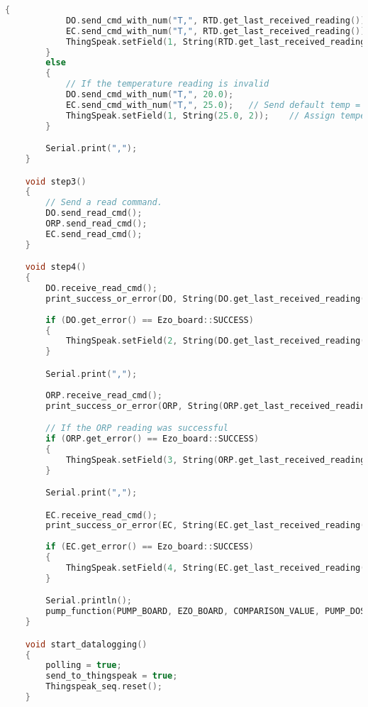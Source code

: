 \begin{lstlisting}[language=C++]
        {
            DO.send_cmd_with_num("T,", RTD.get_last_received_reading());
            EC.send_cmd_with_num("T,", RTD.get_last_received_reading());
            ThingSpeak.setField(1, String(RTD.get_last_received_reading(), 2)); // Assign temperature readings to the first column of thingspeak channel
        } 
        else 
        {
            // If the temperature reading is invalid
            DO.send_cmd_with_num("T,", 20.0);
            EC.send_cmd_with_num("T,", 25.0);   // Send default temp = 25 deg C to PH sensor
            ThingSpeak.setField(1, String(25.0, 2));    // Assign temperature readings to the first column of thingspeak channel
        }

        Serial.print(",");
    }

    void step3() 
    {
        // Send a read command.
        DO.send_read_cmd();
        ORP.send_read_cmd();
        EC.send_read_cmd();
    }

    void step4() 
    {
        DO.receive_read_cmd();
        print_success_or_error(DO, String(DO.get_last_received_reading(), 2).c_str());
        
        if (DO.get_error() == Ezo_board::SUCCESS) 
        {
            ThingSpeak.setField(2, String(DO.get_last_received_reading(), 2));  // Assign PH readings to the second column of thingspeak channel
        }

        Serial.print(",");
        
        ORP.receive_read_cmd();
        print_success_or_error(ORP, String(ORP.get_last_received_reading(), 2).c_str());

        // If the ORP reading was successful
        if (ORP.get_error() == Ezo_board::SUCCESS) 
        {
            ThingSpeak.setField(3, String(ORP.get_last_received_reading(), 0)); // Assign ORP readings to the third column of thingspeak channel
        }

        Serial.print(",");

        EC.receive_read_cmd();
        print_success_or_error(EC, String(EC.get_last_received_reading(), 2).c_str());
        
        if (EC.get_error() == Ezo_board::SUCCESS)
        {
            ThingSpeak.setField(4, String(EC.get_last_received_reading(), 0));
        }

        Serial.println();
        pump_function(PUMP_BOARD, EZO_BOARD, COMPARISON_VALUE, PUMP_DOSE, IS_GREATER_THAN);
    }

    void start_datalogging() 
    {
        polling = true;
        send_to_thingspeak = true;
        Thingspeak_seq.reset();
    }


\end{lstlisting}
